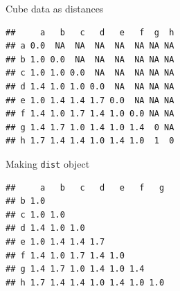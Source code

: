 \begin{frame}[fragile]{Cube data as distances}
 
\begin{knitrout}
\color{fgcolor}\begin{kframe}
\begin{alltt}
\hlkwb{=}\hlstd{(}\hlstd{,}
\end{alltt}
\begin{verbatim}
##     a   b   c   d   e   f  g  h
## a 0.0  NA  NA  NA  NA  NA NA NA
## b 1.0 0.0  NA  NA  NA  NA NA NA
## c 1.0 1.0 0.0  NA  NA  NA NA NA
## d 1.4 1.0 1.0 0.0  NA  NA NA NA
## e 1.0 1.4 1.4 1.7 0.0  NA NA NA
## f 1.4 1.0 1.7 1.4 1.0 0.0 NA NA
## g 1.4 1.7 1.0 1.4 1.0 1.4  0 NA
## h 1.7 1.4 1.4 1.0 1.4 1.0  1  0
\end{verbatim}
\end{kframe}
\end{knitrout}
  
\end{frame}

\begin{frame}[fragile]{Making \texttt{dist} object}
  
\begin{knitrout}
\color{fgcolor}\begin{kframe}
\begin{alltt}
\hlkwb{=}
\end{alltt}
\begin{verbatim}
##     a   b   c   d   e   f   g
## b 1.0                        
## c 1.0 1.0                    
## d 1.4 1.0 1.0                
## e 1.0 1.4 1.4 1.7            
## f 1.4 1.0 1.7 1.4 1.0        
## g 1.4 1.7 1.0 1.4 1.0 1.4    
## h 1.7 1.4 1.4 1.0 1.4 1.0 1.0
\end{verbatim}
\end{kframe}
\end{knitrout}

\end{frame}

